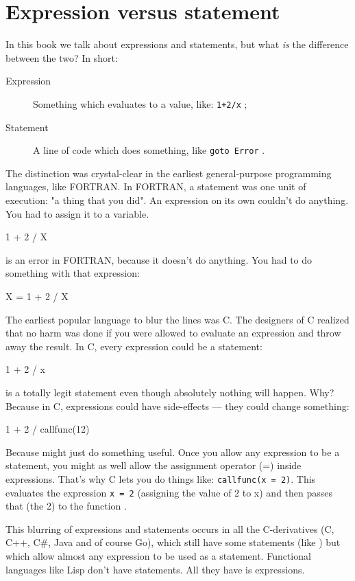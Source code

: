 \section{Expression versus statement}
\label{sec:expression versus statement}
In this book we talk about expressions and statements, but%
what \emph{is} the difference between the two?
In short:
\begin{description}
\item[Expression] Something which evaluates to a value, like:
\lstinline{1+2/x} ;
\item[Statement] A line of code which does something, like
\lstinline{goto Error} .
\end{description}



The distinction was crystal-clear in the earliest general-purpose
programming languages, like FORTRAN. In FORTRAN, a statement was one
unit of execution: "a thing that you did". 
An expression on its own couldn't do anything. You had to assign it to a
variable.
\begin{display}
1 + 2 / X
\end{display}
is an error in FORTRAN, because it doesn't do anything. You had to do
something with that expression: 
\begin{display}{X = 1 + 2 / X}\end{display}

The earliest popular language to blur the lines was C. The designers of
C realized that no harm was done if you were allowed to evaluate an
expression and throw away the result. In C, every expression could be a
statement: 
\begin{display}1 + 2 / x\end{display}
is a totally legit statement even though absolutely nothing will happen.
Why? Because in C, expressions could have side-effects --- they could
change something: \begin{display}{1 + 2 / callfunc(12)}\end{display}

Because  might just do something useful.
Once you allow any expression to be a statement, you might as well allow
the assignment operator (=) inside expressions. That's why C lets you do
things like: \lstinline{callfunc(x = 2)}.
This evaluates the expression \lstinline{x = 2} (assigning the value of 2 to x) and
then passes that (the 2) to the function .

This blurring of expressions and statements occurs in all the
C-derivatives (C, C++, C\#, Java and of course Go), which still have some
statements (like ) but which allow almost any expression to be used
as a statement. Functional languages like Lisp don't have statements.
All they have is expressions. 
